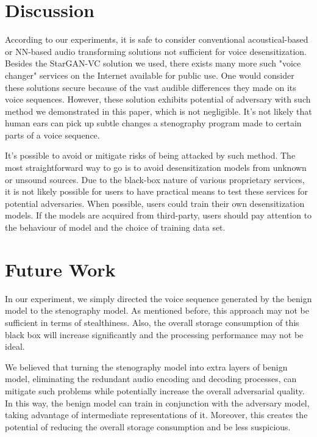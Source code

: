 \documentclass[journal]{IEEEtran} %
\begin{document}
\section{Discussion}

According to our experiments, it is safe to consider conventional acoustical-based or NN-based audio transforming solutions not sufficient for voice desensitization. Besides the StarGAN-VC solution we used, there exists many more such "voice changer" services on the Internet available for public use. One would consider these solutions secure because of the vast audible differences they made on its voice sequences. However, these solution exhibits potential of adversary with such method we demonstrated in this paper, which is not negligible. It's not likely that human ears can pick up subtle changes a stenography program made to certain parts of a voice sequence.

It's possible to avoid or mitigate risks of being attacked by such method. The most straightforward way to go is to avoid desensitization models from unknown or unsound sources. Due to the black-box nature of various proprietary services, it is not likely possible for users to have practical means to test these services for potential adversaries. When possible, users could train their own desensitization models. If the models are acquired from third-party, users should pay attention to the behaviour of model and the choice of training data set.

\section{Future Work}

In our experiment, we simply directed the voice sequence generated by the benign model to the stenography model. As mentioned before, this approach may not be sufficient in terms of stealthiness. Also, the overall storage consumption of this black box will increase significantly and the processing performance may not be ideal. 

We believed that turning the stenography model into extra layers of benign model, eliminating the redundant audio encoding and decoding processes, can mitigate such problems while potentially increase the overall adversarial quality. In this way, the benign model can train in conjunction with the adversary model, taking advantage of intermediate representations of it. Moreover, this creates the potential of reducing the overall storage consumption and be less suspicious.
\end{document}
